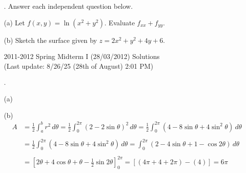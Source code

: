 \documentclass{article}
\begin{document}
\hfill

\hfill

. Answer each independent question below.

\hfill

(a) Let $f(x,y)=\ln\left(x^2+y^2\right)$. Evaluate $f_{xx}+f_{yy}$.

\hfill

(b) Sketch the surface given by $z=2x^2+y^2+4y+6$.

\newpage

\begin{center}
2011-2012 Spring Midterm I (28/03/2012) Solutions\\
(Last update: 8/26/25 (28th of August) 2:01 PM)
\end{center}

.

\hfill

\noindent (a)
\begin{center}
\end{center}

\noindent (b)
\begin{align*}A&=\frac12\int_a^br^2\,d\theta=\frac12\int_0^{2\pi}\left(2-2\sin\theta\right)^2\,d\theta=\frac12\int_0^{2\pi}\left(4-8\sin\theta+4\sin^2\theta\right)\,d\theta\\\\&=\frac12\int_0^{2\pi}\left(4-8\sin\theta+4\sin^2\theta\right)\,d\theta=\int_0^{2\pi}\left(2-4\sin\theta+1-\cos2\theta\right)\,d\theta\\\\&=\left[2\theta+4\cos\theta+\theta-\frac12\sin2\theta\right]_0^{2\pi}=\left[\left(4\pi+4+2\pi\right)-(4)\right]=\boxed{6\pi}\end{align*}
\end{document}
